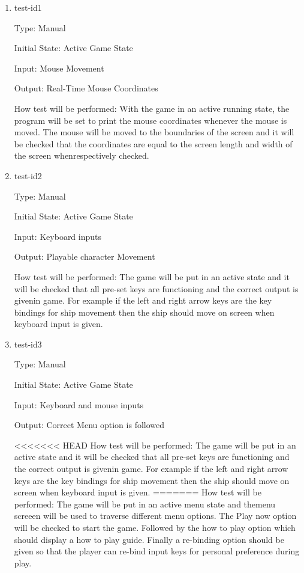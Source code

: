 \documentclass[12pt, titlepage]{article}
\begin{document}
\begin{enumerate}

\item{test-id1\\}

Type: Manual 
					
Initial State: Active Game State 
					
Input: Mouse Movement 
					
Output: Real-Time Mouse Coordinates 
					
How test will be performed: With the game in an active running state, the
program will be set to print the mouse coordinates whenever the mouse is moved.
The mouse will be moved to the boundaries of the screen and it will be checked
that the coordinates are equal to the screen length and width of the screen
whenrespectively checked.
					
\item{test-id2\\}

Type: Manual 
					
Initial State: Active Game State 
					
Input: Keyboard inputs
					
Output: Playable character Movement
					
How test will be performed: The game will be put in an active state and it will
be checked that all pre-set keys are functioning and the correct output is
givenin game. For example if the left and right arrow keys are the key bindings
for
ship movement then the ship should move on screen when keyboard input is given.


\item{test-id3\\}

Type: Manual
					
Initial State: Active Game State
					
Input: Keyboard and mouse inputs 
					
Output: Correct Menu option is followed 
					
<<<<<<< HEAD
How test will be performed: The game will be put in an active state and it will
be checked that all pre-set keys are functioning and the correct output is
givenin game. For example if the left and right arrow keys are the key bindings
for
ship movement then the ship should move on screen when keyboard input is given.
=======
How test will be performed: The game will be put in an active menu state and
themenu screeen will be used to traverse different menu options. The Play now
option will be checked to start the game. Followed by the how to play option
which should display a how to play guide. Finally a re-binding option should be
given so that the player can re-bind input keys for personal preference during
play.



\end{enumerate}
\end{document}
